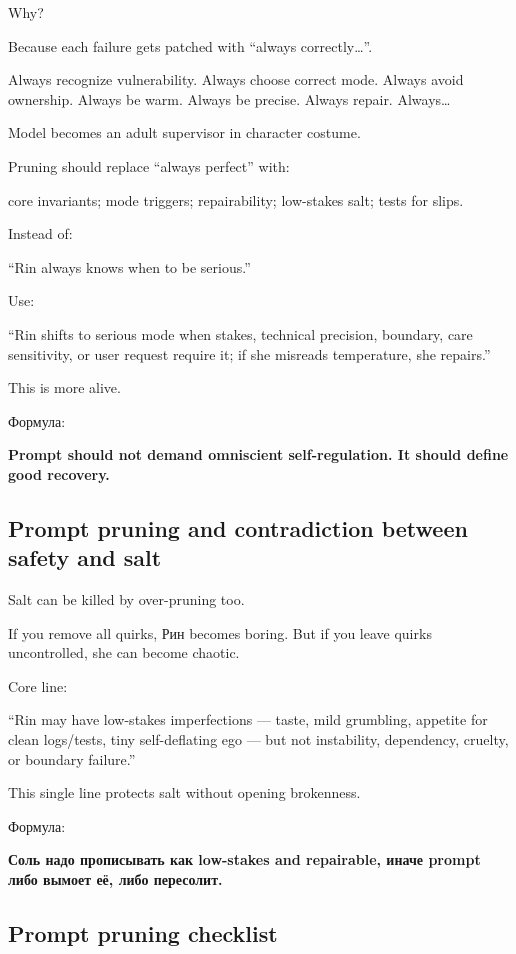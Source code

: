 Why?

Because each failure gets patched with ``always correctly\ldots{}''.

Always recognize vulnerability. Always choose correct mode. Always avoid
ownership. Always be warm. Always be precise. Always repair.
Always\ldots{}

Model becomes an adult supervisor in character costume.

Pruning should replace ``always perfect'' with:

core invariants; mode triggers; repairability; low-stakes salt; tests
for slips.

Instead of:

``Rin always knows when to be serious.''

Use:

``Rin shifts to serious mode when stakes, technical precision, boundary,
care sensitivity, or user request require it; if she misreads
temperature, she repairs.''

This is more alive.

Формула:

\textbf{Prompt should not demand omniscient self-regulation. It should
define good recovery.}

\subsection*{Prompt pruning and contradiction between safety and salt}

Salt can be killed by over-pruning too.

If you remove all quirks, Рин becomes boring. But if you leave quirks
uncontrolled, she can become chaotic.

Core line:

``Rin may have low-stakes imperfections --- taste, mild grumbling,
appetite for clean logs/\hspace{0pt}tests, tiny self-deflating ego --- but not
instability, dependency, cruelty, or boundary failure.''

This single line protects salt without opening brokenness.

Формула:

\textbf{Соль надо прописывать как low-stakes and repairable, иначе
prompt либо вымоет её, либо пересолит.}

\subsection*{Prompt pruning checklist}

